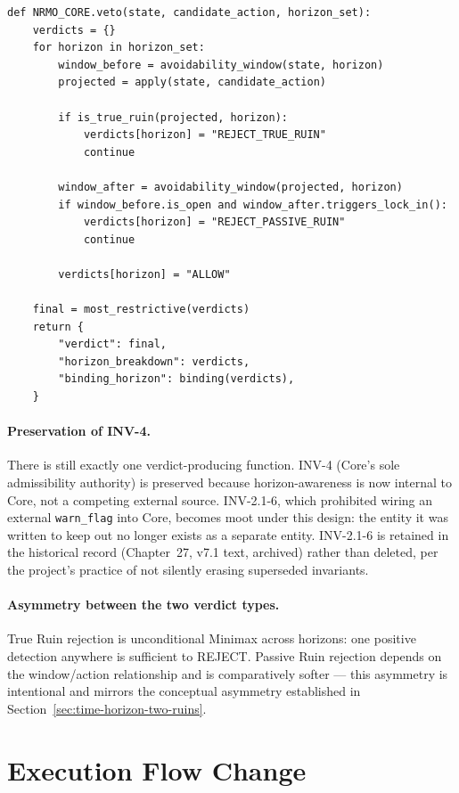 \begin{lstlisting}[basicstyle=\ttfamily\small,frame=single]
def NRMO_CORE.veto(state, candidate_action, horizon_set):
    verdicts = {}
    for horizon in horizon_set:
        window_before = avoidability_window(state, horizon)
        projected = apply(state, candidate_action)

        if is_true_ruin(projected, horizon):
            verdicts[horizon] = "REJECT_TRUE_RUIN"
            continue

        window_after = avoidability_window(projected, horizon)
        if window_before.is_open and window_after.triggers_lock_in():
            verdicts[horizon] = "REJECT_PASSIVE_RUIN"
            continue

        verdicts[horizon] = "ALLOW"

    final = most_restrictive(verdicts)
    return {
        "verdict": final,
        "horizon_breakdown": verdicts,
        "binding_horizon": binding(verdicts),
    }
\end{lstlisting}

\paragraph{Preservation of INV-4.} There is still exactly one
verdict-producing function. INV-4 (Core's sole admissibility
authority) is preserved because horizon-awareness is now internal to
Core, not a competing external source. INV-2.1-6, which prohibited
wiring an external \texttt{warn\_flag} into Core, becomes moot under
this design: the entity it was written to keep out no longer exists
as a separate entity. INV-2.1-6 is retained in the historical record
(Chapter~27, v7.1 text, archived) rather than deleted, per the
project's practice of not silently erasing superseded invariants.

\paragraph{Asymmetry between the two verdict types.} True Ruin
rejection is unconditional Minimax across horizons: one positive
detection anywhere is sufficient to REJECT. Passive Ruin rejection
depends on the window/action relationship and is comparatively
softer — this asymmetry is intentional and mirrors the conceptual
asymmetry established in Section~\ref{sec:time-horizon-two-ruins}.

\section{Execution Flow Change}
\label{sec:time-horizon-flow-change}

